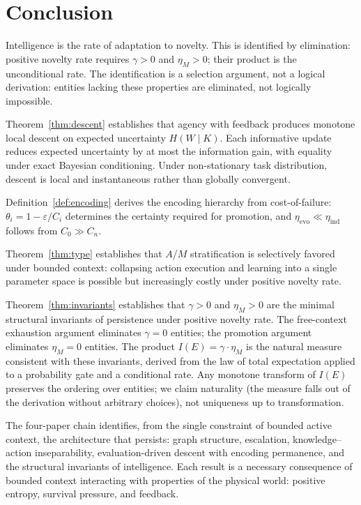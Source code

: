 \documentclass[11pt]{article}
\theoremstyle{definition}
\theoremstyle{remark}
\begin{document}
\section{Conclusion}
\label{sec:conclusion}

Intelligence is the rate of adaptation to novelty. This is identified by elimination: positive novelty rate requires $\gamma > 0$
and $\eta_M > 0$; their product is the unconditional rate. The identification is a selection argument, not a logical derivation: entities lacking these properties are eliminated, not logically impossible.

Theorem~\ref{thm:descent} establishes that agency with feedback
produces monotone local descent on expected uncertainty $H(W \mid K)$.
Each informative update reduces expected uncertainty by at most the
information gain, with equality under exact Bayesian conditioning. Under
non-stationary task distribution, descent is local and instantaneous
rather than globally convergent.

Definition~\ref{def:encoding} derives the encoding hierarchy from
cost-of-failure: $\theta_i = 1 - \varepsilon / C_i$ determines the
certainty required for promotion, and $\eta_{\mathrm{evo}} \ll
\eta_{\mathrm{ind}}$ follows from $C_0 \gg C_n$.

Theorem~\ref{thm:type} establishes that $A$/$M$ stratification is
selectively favored under bounded context: collapsing action execution
and learning into a single parameter space is possible but increasingly
costly under positive novelty rate.

Theorem~\ref{thm:invariants} establishes that $\gamma > 0$ and
$\eta_M > 0$ are the minimal structural invariants of persistence under
positive novelty rate. The free-context exhaustion argument eliminates
$\gamma = 0$ entities; the promotion argument eliminates $\eta_M = 0$
entities. The product $I(E) = \gamma \cdot \eta_M$ is the natural measure
consistent with these invariants, derived from the law of total
expectation applied to a probability gate and a conditional rate.
Any monotone transform of $I(E)$ preserves the ordering over entities;
we claim naturality (the measure falls out of the derivation without
arbitrary choices), not uniqueness up to transformation.

The four-paper chain identifies, from the single constraint of bounded
active context, the architecture that persists: graph structure,
escalation, knowledge--action inseparability, evaluation-driven descent
with encoding permanence, and the structural invariants of intelligence.
Each result is a necessary consequence of bounded context interacting
with properties of the physical world: positive entropy, survival
pressure, and feedback.
\end{document}
